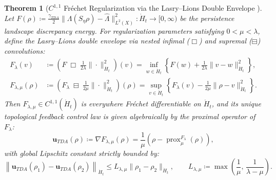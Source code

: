 \documentclass[11pt,a4paper,reqno]{article}
\def\mathrm#1{#1}%
\def\mathcal#1{#1}%
\def\mathbb#1{#1}%
\theoremstyle{plain}
\newtheorem{theorem}{Theorem}[section]
\theoremstyle{definition}
\theoremstyle{remark}
\numberwithin{equation}{section}
\begin{document}
\begin{theorem}[$C^{1,1}$ Fr\'echet Regularization via the Lasry--Lions Double Envelope \cite{lasry1986remarks, attouch1993approximation, ananda2026stochastic_fluid_v2}]\label{thm:lasry_lions}
Let $\mathcal{F}(\rho) \coloneqq \frac{\gamma_{\mathrm{TDA}}}{2}\|\Lambda(\mathcal{S}_\eta\rho) - \hat{\Lambda}\|_{L^2(\mathbb{X})}^2 : \dot{H}_t \to [0, \infty)$ be the persistence landscape discrepancy energy. For regularization parameters satisfying $0 < \mu < \lambda$, define the Lasry--Lions double envelope via nested infimal ($\Box$) and supremal ($\boxminus$) convolutions:
\begin{align}
  \label{eq:lasry_lions_inf}
  \mathcal{F}_\lambda(v) &\coloneqq \left(\mathcal{F} \;\Box\; \frac{1}{2\lambda}\|\cdot\|_{\dot{H}_t}^2\right)(v) = \inf_{w \in \dot{H}_t} \left\{ \mathcal{F}(w) + \frac{1}{2\lambda}\|v - w\|_{\dot{H}_t}^2 \right\}, \\
  \label{eq:lasry_lions_def}
  \mathcal{F}_{\lambda,\mu}(\rho) &\coloneqq \left(\mathcal{F}_\lambda \;\boxminus\; \frac{1}{2\mu}\|\cdot\|_{\dot{H}_t}^2\right)(\rho) = \sup_{v \in \dot{H}_t} \left\{ \mathcal{F}_\lambda(v) - \frac{1}{2\mu}\|\rho - v\|_{\dot{H}_t}^2 \right\}.
\end{align}
Then $\mathcal{F}_{\lambda,\mu} \in C^{1,1}(\dot{H}_t)$ is everywhere Fr\'echet differentiable on $\dot{H}_t$, and its unique topological feedback control law is given algebraically by the proximal operator of $\mathcal{F}_\lambda$:
\begin{equation}\label{eq:lasry_lions_grad}
  \mathbf{u}_{\mathrm{TDA}}(\rho) \coloneqq \nabla \mathcal{F}_{\lambda,\mu}(\rho) = \frac{1}{\mu}\left( \rho - \operatorname{prox}_{\mu}^{\mathcal{F}_\lambda}(\rho) \right),
\end{equation}
with global Lipschitz constant strictly bounded by:
\begin{equation}\label{eq:lasry_lipschitz_bound}
  \left\| \mathbf{u}_{\mathrm{TDA}}(\rho_1) - \mathbf{u}_{\mathrm{TDA}}(\rho_2) \right\|_{\dot{H}_t} \le L_{\lambda,\mu} \|\rho_1 - \rho_2\|_{\dot{H}_t}, \qquad L_{\lambda,\mu} \coloneqq \max\!\left(\frac{1}{\mu},\, \frac{1}{\lambda - \mu}\right).
\end{equation}
\end{theorem}

\end{document}
